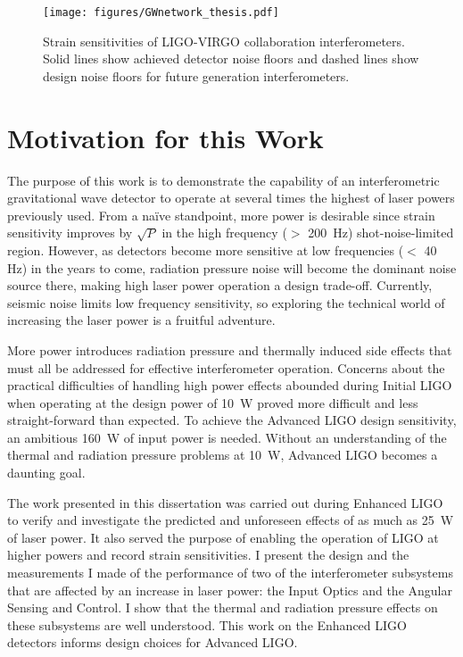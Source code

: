 \begin{figure}
\begin{centering}
\texttt{[image: figures/GWnetwork\_thesis.pdf]}
\caption[Strain sensitivities of LIGO-VIRGO collaboration
interferometers]{Strain sensitivities of LIGO-VIRGO collaboration
  interferometers. Solid lines show achieved detector noise floors and
  dashed lines show design noise floors for future generation
  interferometers.}
\label{fig:h_all}
\end{centering}
\end{figure}


\section{Motivation for this Work}
The purpose of this work is to demonstrate the capability of an
interferometric gravitational wave detector to operate at several
times the highest of laser powers previously used. From a na\"ive
standpoint, more power is desirable since strain sensitivity improves
by $\sqrt{P}$ in the high frequency ($>$ 200~Hz) shot-noise-limited
region. However, as detectors become more sensitive at low frequencies
($<$ 40 Hz) in the years to come, radiation pressure noise will become
the dominant noise source there, making high laser power operation a
design trade-off. Currently, seismic noise limits low frequency
sensitivity, so exploring the technical world of increasing the laser
power is a fruitful adventure.

More power introduces radiation pressure and thermally induced side
effects that must all be addressed for effective interferometer
operation. Concerns about the practical difficulties of handling high
power effects abounded during Initial LIGO when operating at the
design power of 10~W proved more difficult and less straight-forward
than expected. To achieve the Advanced LIGO design sensitivity, an
ambitious 160~W of input power is needed. Without an understanding of
the thermal and radiation pressure problems at 10~W, Advanced LIGO
becomes a daunting goal.

The work presented in this dissertation was carried out during
Enhanced LIGO to verify and investigate the predicted and unforeseen
effects of as much as 25~W of laser power. It also served the purpose
of enabling the operation of LIGO at higher powers and record strain
sensitivities. I present the design and the measurements I made of the
performance of two of the interferometer subsystems that are affected
by an increase in laser power: the Input Optics and the Angular
Sensing and Control. I show that the thermal and radiation pressure
effects on these subsystems are well understood. This work on the
Enhanced LIGO detectors informs design choices for Advanced LIGO.

